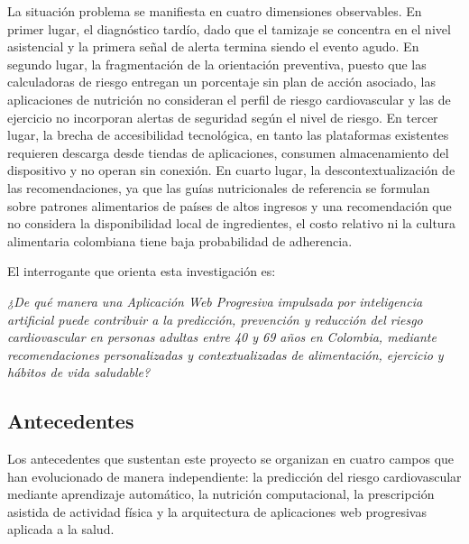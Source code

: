 \documentclass[conference]{IEEEtran}
\begin{document}
La situación problema se manifiesta en cuatro dimensiones observables. En primer lugar, el diagnóstico tardío, dado que el tamizaje se concentra en el nivel asistencial y la primera señal de alerta termina siendo el evento agudo. En segundo lugar, la fragmentación de la orientación preventiva, puesto que las calculadoras de riesgo entregan un porcentaje sin plan de acción asociado, las aplicaciones de nutrición no consideran el perfil de riesgo cardiovascular y las de ejercicio no incorporan alertas de seguridad según el nivel de riesgo. En tercer lugar, la brecha de accesibilidad tecnológica, en tanto las plataformas existentes requieren descarga desde tiendas de aplicaciones, consumen almacenamiento del dispositivo y no operan sin conexión. En cuarto lugar, la descontextualización de las recomendaciones, ya que las guías nutricionales de referencia se formulan sobre patrones alimentarios de países de altos ingresos y una recomendación que no considera la disponibilidad local de ingredientes, el costo relativo ni la cultura alimentaria colombiana tiene baja probabilidad de adherencia.

El interrogante que orienta esta investigación es:

\textit{¿De qué manera una Aplicación Web Progresiva impulsada por inteligencia artificial puede contribuir a la predicción, prevención y reducción del riesgo cardiovascular en personas adultas entre 40 y 69 años en Colombia, mediante recomendaciones personalizadas y contextualizadas de alimentación, ejercicio y hábitos de vida saludable?}

\subsection{Antecedentes}
Los antecedentes que sustentan este proyecto se organizan en cuatro campos que han evolucionado de manera independiente: la predicción del riesgo cardiovascular mediante aprendizaje automático, la nutrición computacional, la prescripción asistida de actividad física y la arquitectura de aplicaciones web progresivas aplicada a la salud.
\end{document}

